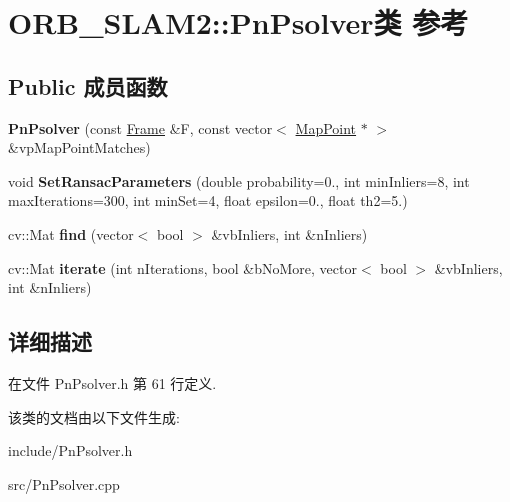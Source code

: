 \hypertarget{classORB__SLAM2_1_1PnPsolver}{\section{O\-R\-B\-\_\-\-S\-L\-A\-M2\-:\-:Pn\-Psolver类 参考}
\label{classORB__SLAM2_1_1PnPsolver}
}
\subsection*{Public 成员函数}
\begin{DoxyCompactItemize}
\item 
\hypertarget{classORB__SLAM2_1_1PnPsolver_a364b44120a5c9e87285bd5f69037c30f}{{\bfseries Pn\-Psolver} (const \hyperlink{classORB__SLAM2_1_1Frame}{Frame} \&F, const vector$<$ \hyperlink{classORB__SLAM2_1_1MapPoint}{Map\-Point} $\ast$ $>$ \&vp\-Map\-Point\-Matches)}\label{classORB__SLAM2_1_1PnPsolver_a364b44120a5c9e87285bd5f69037c30f}

\item 
\hypertarget{classORB__SLAM2_1_1PnPsolver_adff29377dcc77891a33113080b6b1eb7}{void {\bfseries Set\-Ransac\-Parameters} (double probability=0., int min\-Inliers=8, int max\-Iterations=300, int min\-Set=4, float epsilon=0., float th2=5.)}\label{classORB__SLAM2_1_1PnPsolver_adff29377dcc77891a33113080b6b1eb7}

\item 
\hypertarget{classORB__SLAM2_1_1PnPsolver_a784429037a79cb53923f4db181a4d115}{cv\-::\-Mat {\bfseries find} (vector$<$ bool $>$ \&vb\-Inliers, int \&n\-Inliers)}\label{classORB__SLAM2_1_1PnPsolver_a784429037a79cb53923f4db181a4d115}

\item 
\hypertarget{classORB__SLAM2_1_1PnPsolver_abbef2ac776747661112246e85667f452}{cv\-::\-Mat {\bfseries iterate} (int n\-Iterations, bool \&b\-No\-More, vector$<$ bool $>$ \&vb\-Inliers, int \&n\-Inliers)}\label{classORB__SLAM2_1_1PnPsolver_abbef2ac776747661112246e85667f452}

\end{DoxyCompactItemize}


\subsection{详细描述}


在文件 Pn\-Psolver.\-h 第 61 行定义.



该类的文档由以下文件生成\-:\begin{DoxyCompactItemize}
\item 
include/Pn\-Psolver.\-h\item 
src/Pn\-Psolver.\-cpp\end{DoxyCompactItemize}
